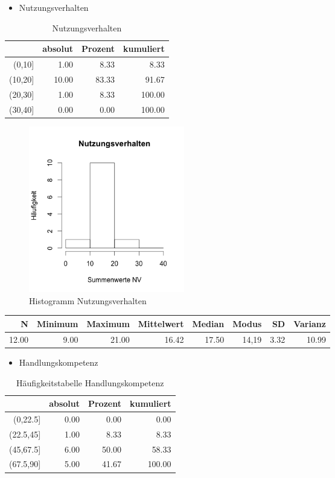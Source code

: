 \documentclass[12pt, bibliography=totoc]{scrartcl}
\begin{document}
\begin{itemize}
\tightlist
\item
  Nutzungsverhalten
\end{itemize}

\begin{table}[H]
\centering
\caption{Nutzungsverhalten}
\begin{tabular}{rrrr}
  \hline
 & absolut & Prozent & kumuliert \\
  \hline
(0,10] & 1.00 & 8.33 & 8.33 \\
  (10,20] & 10.00 & 83.33 & 91.67 \\
  (20,30] & 1.00 & 8.33 & 100.00 \\
  (30,40] & 0.00 & 0.00 & 100.00 \\
   \hline
\end{tabular}
\end{table}

\begin{figure}[H]
\centering
\caption{Histogramm Nutzungsverhalten}
\includegraphics[width=0.33\textwidth]{Anhang/NVHist.png}
\end{figure}

\begin{table}[ht]
\centering
\begin{tabular}{rrrrrrrr}
  \hline
  N & Minimum & Maximum & Mittelwert & Median & Modus & SD & Varianz \\
  \hline
 12.00 & 9.00 & 21.00 & 16.42 & 17.50 & 14,19 & 3.32 & 10.99 \\     
   \hline
\end{tabular}
\end{table}

\begin{itemize}
\tightlist
\item
  Handlungskompetenz
\end{itemize}

\begin{table}[H]
\centering
\caption{Häufigkeitstabelle Handlungskompetenz}
\begin{tabular}{rrrr}
  \hline
 & absolut & Prozent & kumuliert \\
  \hline
(0,22.5] & 0.00 & 0.00 & 0.00 \\
  (22.5,45] & 1.00 & 8.33 & 8.33 \\
  (45,67.5] & 6.00 & 50.00 & 58.33 \\
  (67.5,90] & 5.00 & 41.67 & 100.00 \\
   \hline
\end{tabular}
\end{table}
\end{document}
